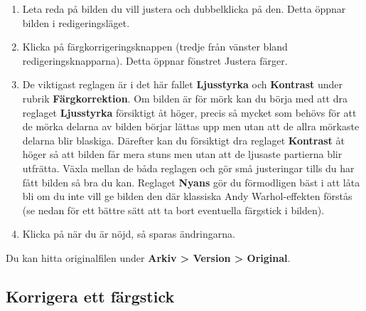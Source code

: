 \documentclass[a4paper,final]{memoir} %
\begin{document}
\begin{enumerate}

\item Leta reda på bilden du vill justera och dubbelklicka på den. Detta öppnar bilden i redigeringsläget. 

\item Klicka på färgkorrigeringsknappen (tredje från vänster bland redigeringsknapparna). Detta öppnar fönstret Justera färger.

\item De viktigast reglagen är i det här fallet \textbf{Ljusstyrka} och \textbf{Kontrast} under rubrik \textbf{Färgkorrektion}. Om bilden är för mörk kan du börja med att dra reglaget \textbf{Ljusstyrka} försiktigt åt höger, precis så mycket som behövs för att de mörka delarna av bilden börjar lättas upp men utan att de allra mörkaste delarna blir blaskiga. Därefter kan du försiktigt dra reglaget \textbf{Kontrast} åt höger så att bilden får mera stuns men utan att de ljusaste partierna blir utfrätta. Växla mellan de båda reglagen och gör små justeringar tills du har fått bilden så bra du kan.  Reglaget \textbf{Nyans} gör du förmodligen bäst i att låta bli om du inte vill ge bilden den där klassiska Andy Warhol-effekten förstås (se nedan för ett bättre sätt att ta bort eventuella färgstick i bilden).

\xnegskip{}

\item Klicka på \xok{} när du är nöjd, så sparas ändringarna. 

\end{enumerate}

Du kan hitta originalfilen under \textbf{Arkiv \textgreater{} Version \textgreater{} Original}.


\subsection{Korrigera ett färgstick}
\end{document}
